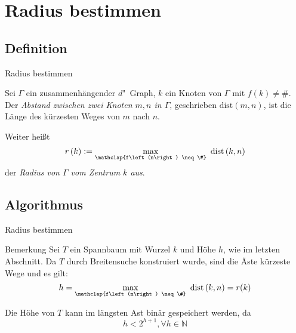 \documentclass[18pt]{beamer}
\newcommand{\defWord}[1]{\emph{#1}}
\begin{document}
\section{Radius bestimmen}
\subsection{Definition}
\begin{frame}{Radius bestimmen}
	\begin{definition}[Abstand]
		Sei $\Gamma$ ein zusammenhängender $d$"~Graph, $k$ ein Knoten von $\Gamma$ mit $f\left(k\right) \neq \#$.
		Der \defWord{Abstand zwischen zwei Knoten $m, n$ in $\Gamma$}, geschrieben $\text{dist}\left(m , n\right)$, ist die Länge des kürzesten Weges von $m$ nach $n$.
	\end{definition}
	\begin{definition}[Radius]
		Weiter heißt
		\begin{displaymath}
			r\left(k\right) := \max_{\mathclap{f\left(n\right) \neq \#}} \text{ dist}\left(k, n\right)
		\end{displaymath}
		der \defWord{Radius von $\Gamma$ vom Zentrum $k$ aus}.
	\end{definition}
\end{frame}
\subsection{Algorithmus}
\begin{frame}{Radius bestimmen}
	\begin{exampleblock}{Bemerkung}
		Sei $T$ ein Spannbaum mit Wurzel $k$ und Höhe $h$, wie im letzten Abschnitt. Da $T$ durch Breitensuche konstruiert wurde, sind die Äste kürzeste Wege und es gilt:
		\begin{displaymath}
			h = \max_{\mathclap{f\left(n\right) \neq \#}} \text{ dist}\left(k, n\right) = r(k)
		\end{displaymath}
		
		Die Höhe von $T$ kann im längsten Ast binär gespeichert werden, da
		\begin{displaymath}
			h < 2^{h + 1} , \forall h \in \mathbb{N}
		\end{displaymath}
	\end{exampleblock}
\end{frame}
\end{document}
